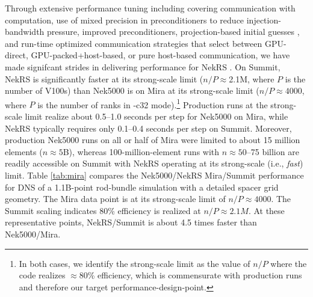 Through extensive performance tuning including covering communication with
computation, use of mixed precision in preconditioners to reduce
injection-bandwidth pressure, improved preconditioners, projection-based
initial guesses \cite{fisc98}, and run-time optimized
communication strategies that select between GPU-direct, GPU-packed+host-based,
or pure host-based communication, we have made signifcant strides in delivering
performance for NekRS \cite{nekrs}.  On Summit, NekRS is significantly faster at
its strong-scale limit ($n/P \approx $2.1M, where $P$ is the number of V100s)
than Nek5000 is on Mira at its strong-scale limit ($n/P \approx 4000$, where $P$
is the number of ranks in -c32 mode).\footnote{In both cases, we identify the
strong-scale limit as the value of $n/P$ where the code realizes $\approx$80\%
efficiency, which is commensurate with production runs and therefore our target
performance-design-point.}  Production runs at the strong-scale limit realize
about 0.5--1.0 seconds per step for Nek5000 on Mira, while NekRS typically
requires only 0.1--0.4 seconds per step on Summit.  Moreover, production
Nek5000 runs on all or half of Mira were limited to about 15 million elements
($n \approx 5$B), whereas 100-million-element runs with $n \approx 50$--75
billion are readily accessible on Summit with NekRS operating at its
strong-scale (i.e., {\em fast}) limit.  
Table \ref{tab:mira} compares the Nek5000/NekRS Mira/Summit
performance for DNS of a 1.1B-point rod-bundle simulation with a detailed
spacer grid geometry.  The Mira data point is at its strong-scale limit
of $n/P \approx 4000$.  The Summit scaling indicates 80\%
efficiency is realized at $n/P \approx 2.1M$.  At these representative
points, NekRS/Summit is about 4.5 times faster than Nek5000/Mira. \\


